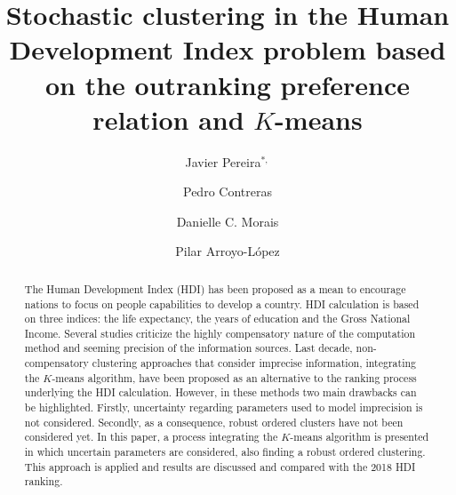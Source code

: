 \documentclass[]{elsarticle}
\theoremstyle{definition}
\begin{document}
\begin{frontmatter}                           %


\title{Stochastic clustering in the Human Development Index problem based on the outranking preference relation and $K$-means}



%

\author[utc]{Javier Pereira$^{*,}$\cortext[cor1]}
\author[ap]{Pedro Contreras}
\author[ufpe]{Danielle C. Morais}
\author[itesm]{Pilar Arroyo-L\'opez}




\address[utc]{Universidad Tecnol\'ogica de Chile Inacap, Santiago, Chile (xjavierpereira7@gmail.com); \\}
\address[ap]{Berlin, Germany (pedro.contreras@gmail.com);}
\address[ufpe]{Universidade Federal de Pernambuco, CDSID (dcmorais@cdsid.org.br);}
\address[itesm]{Tecnologico de Monterrey, Campus Toluca, M\'exico (pilar.arroyo@itesm.mx);}



\begin{abstract}
The Human Development Index (HDI) has been proposed as a mean to encourage nations to focus on people capabilities to develop a country.  HDI calculation is based on three indices: the life expectancy, the years of education and the Gross National Income. Several studies criticize the highly compensatory nature of the computation method and seeming precision of the information sources. Last decade, non-compensatory clustering approaches that consider imprecise information, integrating the $K$-means algorithm,  have been proposed as an alternative to the ranking process underlying the HDI calculation. However, in these methods two main drawbacks can be highlighted. Firstly, uncertainty regarding parameters used to model imprecision is not considered. Secondly,  as a consequence, robust ordered clusters have not been considered yet. In this paper, a process integrating  the $K$-means algorithm is presented in which uncertain parameters are considered, also finding  a robust ordered clustering.  This approach is applied and results are discussed and compared with the 2018 HDI ranking.
\end{abstract}


\end{frontmatter}
\end{document}
